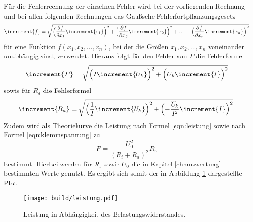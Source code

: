 Für die Fehlerrechnung der einzelnen Fehler wird bei der vorliegenden Rechnung und bei allen folgenden Rechnungen das Gaußsche Fehlerfortpflanzungsgesetz
\begin{equation}
\increment{f} = \sqrt{\Bigl(\frac{\partial f}{\partial x_1}\increment{x_1}\Bigr)^2 + \Bigl(\frac{\partial f}{\partial x_2}\increment{x_2}\Bigr)^2 + \dotsc + \Bigl(\frac{\partial f}{\partial x_n}\increment{x_n}\Bigr)^2}
\end{equation}
für eine Funktion $f(x_1,x_2, \dotsc ,x_n)$, bei der die Größen $x_1, x_2, \dotsc , x_n$ voneinander unabhängig sind, verwendet.
Hieraus folgt für den Fehler von $P$ die Fehlerformel
\begin{equation}
  \increment{P} = \sqrt{ \Bigl( I \increment{U_k} \Bigr)^2 + \Bigl( U_k \increment{I}  \Bigr)^2 }
\end{equation}
sowie für $R_a$ die Fehlerformel
\begin{equation}
  \increment{R_a} = \sqrt{ \Bigl( \frac{1}{I} \increment{U_k} \Bigr)^2 + \Bigl( - \frac{U_k}{I^2} \increment{I}  \Bigr)^2}.
\end{equation}
Zudem wird als Theoriekurve die Leistung nach Formel \ref{eqn:leistung} sowie nach Formel \ref{eqn:klemmspannung} zu
\begin{equation}
  P = \frac{U_0^2}{(R_i + R_a)^2} R_a
\end{equation}
bestimmt.
Hierbei werden für $R_i$ sowie $U_0$ die in Kapitel \ref{ch:auswertung} bestimmten Werte genutzt.
Es ergibt sich somit der in Abbildung \ref{fig:5} dargestellte Plot.
\\
\begin{figure}[H]
  \centering
  \texttt{[image: build/leistung.pdf]}
  \caption{Leistung in Abhängigkeit des Belastungswiderstandes.}
  \label{fig:5}
\end{figure}
%
%    
%
